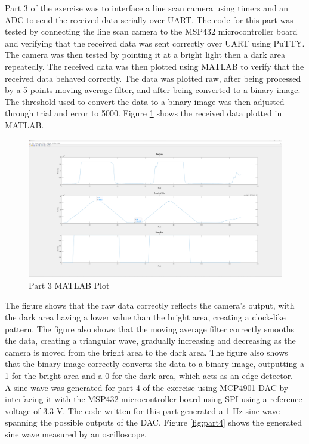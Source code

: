 \documentclass[CMPE]{KGCOEReport}
\begin{document}
Part 3 of the exercise was to interface a line scan camera using timers and an ADC to send the received data serially over UART. The code for this part was tested by connecting the line scan camera to the MSP432 microcontroller board and verifying that the received data was sent correctly over UART using PuTTY.\\

The camera was then tested by pointing it at a bright light then a dark area repeatedly. The received data was then plotted using MATLAB to verify that the received data behaved correctly. The data was plotted raw, after being processed by a 5-points moving average filter, and after being converted to a binary image. The threshold used to convert the data to a binary image was then adjusted through trial and error to 5000. Figure \ref{fig:part3} shows the received data plotted in MATLAB.

\begin{figure}[H]
    \centering
    \includegraphics[width=1.00\textwidth]{part3.png}
    \caption{Part 3 MATLAB Plot}
    \label{fig:part3}
\end{figure}

The figure shows that the raw data correctly reflects the camera's output, with the dark area having a lower value than the bright area, creating a clock-like pattern. The figure also shows that the moving average filter correctly smooths the data, creating a triangular wave, gradually increasing and decreasing as the camera is moved from the bright area to the dark area. The figure also shows that the binary image correctly converts the data to a binary image, outputting a 1 for the bright area and a 0 for the dark area, which acts as an edge detector.\\

A sine wave was generated for part 4 of the exercise using MCP4901 DAC by interfacing it with the MSP432 microcontroller board using SPI using a reference voltage of 3.3 V. The code written for this part generated a 1 Hz sine wave spanning the possible outputs of the DAC. Figure \ref{fig:part4} shows the generated sine wave measured by an oscilloscope.
\end{document}
